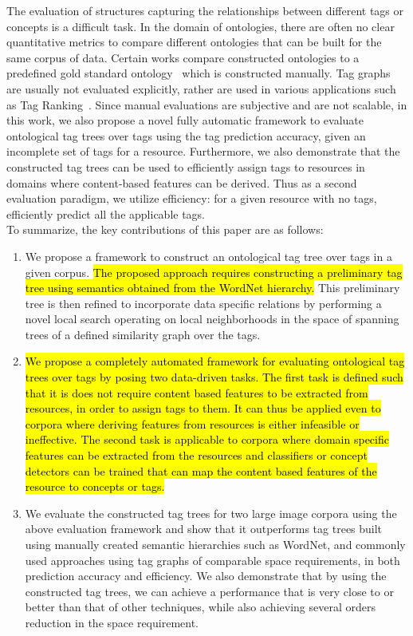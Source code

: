 The evaluation of structures capturing the relationships between different tags or concepts is a difficult task. In the domain of ontologies, there are often no clear quantitative metrics to compare different ontologies that can be built for the same corpus of data. Certain works compare constructed ontologies to a predefined gold standard ontology~\cite{porzel2004task} which is  constructed manually. 
Tag graphs are usually not evaluated explicitly, rather are used in various applications such as Tag Ranking~\cite{liu2009tag}. Since manual evaluations are subjective and are not scalable, in this work, we also propose a novel fully automatic framework to evaluate ontological tag trees over tags using the tag prediction accuracy, given an incomplete set of tags for a resource. 
Furthermore, we also demonstrate that the constructed tag trees can be used to efficiently assign tags to resources in domains where content-based features can be derived. Thus as a second evaluation paradigm, we utilize efficiency: for a given resource with no tags, efficiently predict all the applicable tags.  \\
\indent To summarize, the key contributions of this paper are as follows:
\begin{enumerate}
	\item We propose a framework to construct an ontological tag tree over tags in a given corpus. \hl{The proposed approach requires constructing a preliminary tag tree using semantics obtained from the WordNet hierarchy.} This preliminary tree is then refined to incorporate data specific relations by performing a novel local search operating on local neighborhoods in the space of spanning trees of a defined similarity graph over the tags. 
	\item \hl{We propose a completely automated framework for evaluating ontological tag trees over tags by posing two data-driven tasks. The first task is defined such that it is does not require content based features to be extracted from resources, in order to assign tags to them. It can thus be applied even to corpora where deriving features from resources is either infeasible or ineffective. The second task is applicable to corpora where domain specific features can be extracted from the resources and classifiers or concept detectors can be trained that can map the content based features of the resource to concepts or tags. 
}
    \item We evaluate the constructed tag trees for two large image corpora using the above evaluation framework and show that it outperforms tag trees built using manually created semantic hierarchies such as WordNet, and commonly used approaches using tag graphs of comparable space requirements, in both prediction accuracy and efficiency. We also demonstrate that by using the constructed tag trees, we can achieve a performance that is very close to or better than that of other techniques, while also achieving several orders reduction in the space requirement. 
\end{enumerate}












